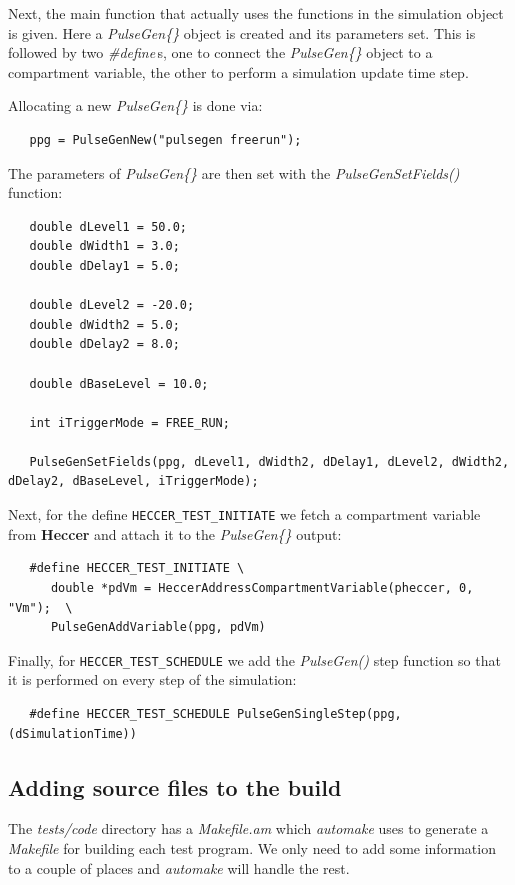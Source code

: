 \documentclass[12pt]{article}
\begin{document}
Next, the main function that actually uses the functions in the simulation object is given. Here a {\it PulseGen\{\}} object is created and its parameters set. This is followed by two {\it \#define}\,s, one to connect the {\it PulseGen\{\}} object to a compartment variable, the other to perform a simulation update time step.

Allocating a new {\it PulseGen\{\}}  is done via:
\begin{verbatim}
   ppg = PulseGenNew("pulsegen freerun");
\end{verbatim}
The parameters of {\it PulseGen\{\}} are then set with the {\it PulseGenSetFields()} function:
\begin{verbatim}
   double dLevel1 = 50.0;
   double dWidth1 = 3.0;
   double dDelay1 = 5.0;
    
   double dLevel2 = -20.0;
   double dWidth2 = 5.0;
   double dDelay2 = 8.0;

   double dBaseLevel = 10.0;

   int iTriggerMode = FREE_RUN;

   PulseGenSetFields(ppg, dLevel1, dWidth2, dDelay1, dLevel2, dWidth2, dDelay2, dBaseLevel, iTriggerMode);   
\end{verbatim}

Next, for the define {\tt HECCER\_TEST\_INITIATE} we fetch a compartment variable from {\bf Heccer} and attach it to the  {\it PulseGen\{\}} output:
\begin{verbatim}
   #define HECCER_TEST_INITIATE \
      double *pdVm = HeccerAddressCompartmentVariable(pheccer, 0, "Vm");  \
      PulseGenAddVariable(ppg, pdVm)
\end{verbatim}
Finally, for {\tt HECCER\_TEST\_SCHEDULE} we add the {\it PulseGen()} step function so that it is performed on every step of the simulation:
\begin{verbatim}
   #define HECCER_TEST_SCHEDULE PulseGenSingleStep(ppg, (dSimulationTime))
\end{verbatim}

\subsection*{Adding source files to the build}

The {\it tests/code} directory has a {\it Makefile.am} which {\it automake} uses to generate a {\it Makefile} for building each test program. We only need to add some information to a couple of places and {\it automake} will handle the rest.
\end{document}
